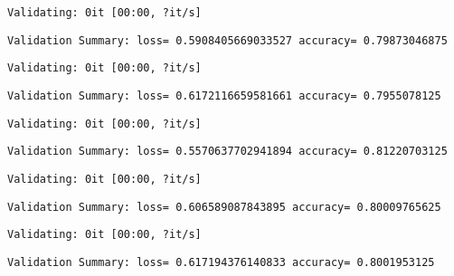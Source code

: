 \documentclass[11pt]{article}
\begin{document}
    
    \begin{Verbatim}[commandchars=\\\{\}]
Validating: 0it [00:00, ?it/s]
    \end{Verbatim}

    
    \begin{Verbatim}[commandchars=\\\{\}]
Validation Summary: loss= 0.5908405669033527 accuracy= 0.79873046875
    \end{Verbatim}

    
    \begin{Verbatim}[commandchars=\\\{\}]
Validating: 0it [00:00, ?it/s]
    \end{Verbatim}

    
    \begin{Verbatim}[commandchars=\\\{\}]
Validation Summary: loss= 0.6172116659581661 accuracy= 0.7955078125
    \end{Verbatim}

    
    \begin{Verbatim}[commandchars=\\\{\}]
Validating: 0it [00:00, ?it/s]
    \end{Verbatim}

    
    \begin{Verbatim}[commandchars=\\\{\}]
Validation Summary: loss= 0.5570637702941894 accuracy= 0.81220703125
    \end{Verbatim}

    
    \begin{Verbatim}[commandchars=\\\{\}]
Validating: 0it [00:00, ?it/s]
    \end{Verbatim}

    
    \begin{Verbatim}[commandchars=\\\{\}]
Validation Summary: loss= 0.606589087843895 accuracy= 0.80009765625
    \end{Verbatim}

    
    \begin{Verbatim}[commandchars=\\\{\}]
Validating: 0it [00:00, ?it/s]
    \end{Verbatim}

    
    \begin{Verbatim}[commandchars=\\\{\}]
Validation Summary: loss= 0.617194376140833 accuracy= 0.8001953125
    \end{Verbatim}
\end{document}

